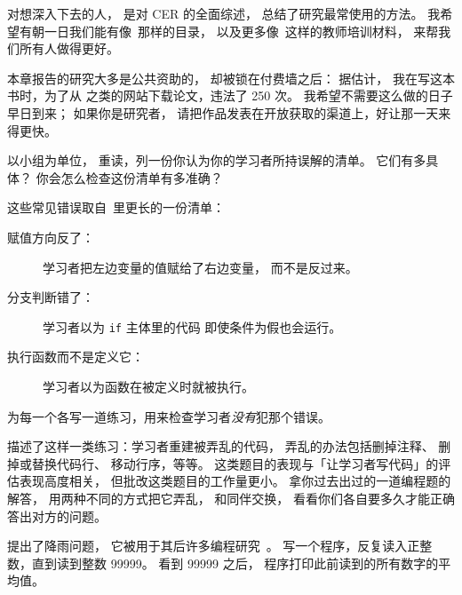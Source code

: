 
对想深入下去的人，
\cite{Finc2019}是对 CER 的全面综述，
\cite{Ihan2016}总结了研究最常使用的方法。
我希望有朝一日我们能有像~\cite{Ojos2015}那样的目录，
以及更多像~\cite{Hazz2014,Guzd2015a,Sent2018}这样的教师培训材料，
来帮我们所有人做得更好。

本章报告的研究大多是公共资助的，
却被锁在付费墙之后：
据估计，
我在写这本书时，为了从  之类的网站下载论文，违法了 250 次。
我希望不需要这么做的日子早日到来；
如果你是研究者，
请把作品发表在开放获取的渠道上，好让那一天来得更快。



以小组为单位，
重读，列一份你认为你的学习者所持误解的清单。
它们有多具体？
你会怎么检查这份清单有多准确？


这些常见错误取自~\cite{Sirk2012}里更长的一份清单：

\begin{description}

\item[赋值方向反了：]
  学习者把左边变量的值赋给了右边变量，
  而不是反过来。

\item[分支判断错了：]
  学习者以为 \texttt{if} 主体里的代码
  即使条件为假也会运行。

\item[执行函数而不是定义它：]
  学习者以为函数在被定义时就被执行。

\end{description}

\noindent
为每一个各写一道练习，用来检查学习者\emph{没有}犯那个错误。


\cite{Chen2017}描述了这样一类练习：学习者重建被弄乱的代码，
弄乱的办法包括删掉注释、
删掉或替换代码行、
移动行序，等等。
这类题目的表现与「让学习者写代码」的评估表现高度相关，
但批改这类题目的工作量更小。
拿你过去出过的一道编程题的解答，
用两种不同的方式把它弄乱，
和同伴交换，
看看你们各自要多久才能正确答出对方的问题。


\cite{Solo1986}提出了降雨问题，
它被用于其后许多编程研究~\cite{Fisl2014,Simo2013,Sepp2015}。
写一个程序，反复读入正整数，直到读到整数 99999。
看到 99999 之后，
程序打印此前读到的所有数字的平均值。

